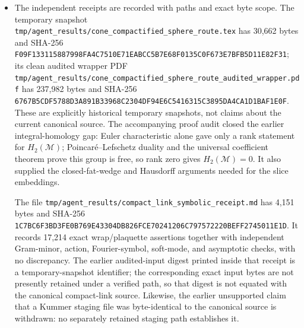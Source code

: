\begin{itemize}[leftmargin=1.8em]
\item The independent receipts are recorded with paths and exact byte scope.
The temporary snapshot
\texttt{tmp/agent\_results/cone\_compactified\_sphere\_route.tex}
has 30,662 bytes and SHA-256
\texttt{F09F133115887998FA4C7510E71EABCC5B7E68F0135C0F673E7BFB5D11E82F31};
its clean audited wrapper PDF
\texttt{tmp/agent\_results/cone\_compactified\_sphere\_route\_audited\_wrapper.pdf}
has 237,982 bytes and SHA-256
\texttt{6767B5CDF5788D3A891B33968C2304DF94E6C5416315C3895DA4CA1D1BAF1E0F}.
These are explicitly historical temporary snapshots, not claims about the
current canonical source.  The accompanying proof audit closed the earlier
integral-homology gap: Euler characteristic alone gave only a rank statement
for $H_2(\mathcal M)$; Poincar\'e--Lefschetz duality and the universal
coefficient theorem prove this group is free, so rank zero gives
$H_2(\mathcal M)=0$.  It also supplied the closed-fat-wedge and Hausdorff
arguments needed for the slice embeddings.

The file
\texttt{tmp/agent\_results/compact\_link\_symbolic\_receipt.md}
has 4,151 bytes and SHA-256
\texttt{1C7BC6F3BD3FE0B769E43304DB826FCE70241206C797572220BEFF2745011E1D}.
It records 17,214 exact wrap/plaquette assertions together with independent
Gram-minor, action, Fourier-symbol, soft-mode, and asymptotic checks, with no
discrepancy.  The earlier audited-input digest printed inside that receipt is
a temporary-snapshot identifier; the corresponding exact input bytes are not
presently retained under a verified path, so that digest is not equated with
the canonical compact-link source.  Likewise, the earlier unsupported claim
that a Kummer staging file was byte-identical to the canonical source is
withdrawn: no separately retained staging path establishes it.


\end{itemize}
